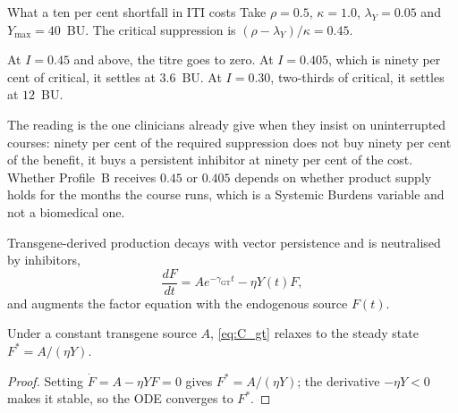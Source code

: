 \begin{workedexample}{What a ten per cent shortfall in ITI costs}
Take $\rho=0.5$, $\kappa=1.0$, $\lambda_Y=0.05$ and $Y_{\max}=40$~BU. The
critical suppression is $(\rho-\lambda_Y)/\kappa=0.45$.


\noindent At $I=0.45$ and above, the titre goes to zero. At $I=0.405$, which is
ninety per cent of critical, it settles at $3.6$~BU. At $I=0.30$, two-thirds of
critical, it settles at $12$~BU.

The reading is the one clinicians already give when they insist on
uninterrupted courses: ninety per cent of the required suppression does not buy
ninety per cent of the benefit, it buys a persistent inhibitor at ninety per
cent of the cost. Whether Profile~B receives $0.45$ or $0.405$ depends on whether
product supply holds for the months the course runs, which is a Systemic
Burdens variable and not a biomedical one.

\end{workedexample}

\begin{definition}
\label{def:C_gt}
Transgene-derived production decays with vector persistence and is neutralised by
inhibitors, \citep{nathwani_2011}
\begin{equation}
\frac{dF}{dt}=A e^{-\gamma_{\text{GT}}t}-\eta Y(t)F,
\label{eq:C_gt}
\end{equation}
and augments the factor equation with the endogenous source $F(t)$.
\end{definition}

\begin{proposition}
\label{prop:C_gt}
Under a constant transgene source $A$, \eqref{eq:C_gt} relaxes to the steady
state $F^\ast=A/(\eta Y)$.
\end{proposition}
\begin{proof}
Setting $\dot F=A-\eta YF=0$ gives $F^\ast=A/(\eta Y)$; the derivative $-\eta Y<0$
makes it stable, so the ODE converges to $F^\ast$.
\end{proof}

